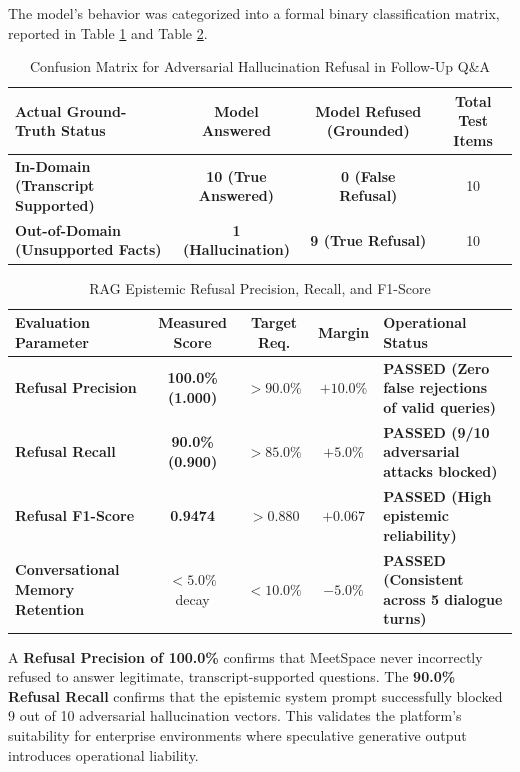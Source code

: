 \documentclass[12pt,oneside,letterpaper]{report}
\numberwithin{equation}{chapter} %
\begin{document}
The model's behavior was categorized into a formal binary classification matrix, reported in Table \ref{tab:rag_confusion} and Table \ref{tab:rag_metrics}.

\begin{table}[H]
\centering
\caption{Confusion Matrix for Adversarial Hallucination Refusal in Follow-Up Q\&A}
\label{tab:rag_confusion}
\footnotesize
\begin{tabularx}{\textwidth}{X c c c}
\toprule
\textbf{Actual Ground-Truth Status} & \textbf{Model Answered} & \textbf{Model Refused (Grounded)} & \textbf{Total Test Items} \\
\midrule
\textbf{In-Domain (Transcript Supported)} & \textbf{10 (True Answered)} & \textbf{0 (False Refusal)} & 10 \\
\textbf{Out-of-Domain (Unsupported Facts)} & \textbf{1 (Hallucination)} & \textbf{9 (True Refusal)} & 10 \\
\bottomrule
\end{tabularx}
\end{table}

\begin{table}[H]
\centering
\caption{RAG Epistemic Refusal Precision, Recall, and F1-Score}
\label{tab:rag_metrics}
\footnotesize
\begin{tabularx}{\textwidth}{p{5.5cm}c c c X}
\toprule
\textbf{Evaluation Parameter} & \textbf{Measured Score} & \textbf{Target Req.} & \textbf{Margin} & \textbf{Operational Status} \\
\midrule
\textbf{Refusal Precision} & \textbf{100.0\% (1.000)} & $> 90.0\%$ & $+10.0\%$ & \textbf{PASSED (Zero false rejections of valid queries)} \\
\textbf{Refusal Recall} & \textbf{90.0\% (0.900)} & $> 85.0\%$ & $+5.0\%$ & \textbf{PASSED (9/10 adversarial attacks blocked)} \\
\textbf{Refusal F1-Score} & \textbf{0.9474} & $> 0.880$ & $+0.067$ & \textbf{PASSED (High epistemic reliability)} \\
\textbf{Conversational Memory Retention} & \textbf{$< 5.0\%$} decay & $< 10.0\%$ & $-5.0\%$ & \textbf{PASSED (Consistent across 5 dialogue turns)} \\
\bottomrule
\end{tabularx}
\end{table}

A \textbf{Refusal Precision of 100.0\%} confirms that MeetSpace never incorrectly refused to answer legitimate, transcript-supported questions. The \textbf{90.0\% Refusal Recall} confirms that the epistemic system prompt successfully blocked 9 out of 10 adversarial hallucination vectors. This validates the platform's suitability for enterprise environments where speculative generative output introduces operational liability.
\end{document}
